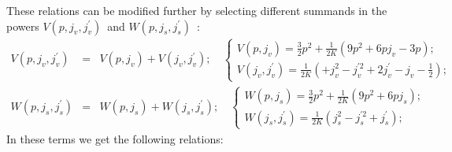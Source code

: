 \documentclass{article}
\begin{document}
These relations can be modified further by selecting different summands in
the powers $V\left( p,j_{v},j_{v}^{\prime }\right) $\ and $W\left(
p,j_{s},j_{s}^{\prime }\right) $\ :
\begin{eqnarray*}
V\left( p,j_{v},j_{v}^{\prime }\right)  &=&V\left( p,j_{v}\right) +V\left(
j_{v},j_{v}^{\prime }\right) ;\quad \left\{
\begin{array}{c}
V\left( p,j_{v}\right) =\frac{3}{2}p^{2}+\frac{1}{2K}\left(
9p^{2}+6pj_{v}-3p\right) ; \\
V\left( j_{v},j_{v}^{\prime }\right) =\frac{1}{2K}\left(
+j_{v}^{2}-j_{v}^{\prime 2}+2j_{v}^{\prime }-j_{v}-\frac{1}{2}\right) ;
\end{array}
\right.  \\
W\left( p,j_{s},j_{s}^{\prime }\right)  &=&W\left( p,j_{s}\right) +W\left(
j_{s},j_{s}^{\prime }\right) ;\quad \left\{
\begin{array}{c}
W\left( p,j_{s}\right) =\frac{3}{2}p^{2}+\frac{1}{2K}\left(
9p^{2}+6pj_{s}\right) ; \\
W\left( j_{s},j_{s}^{\prime }\right) =\frac{1}{2K}\left(
j_{s}^{2}-j_{s}^{\prime 2}+j_{s}^{\prime }\right) ;
\end{array}
\right.
\end{eqnarray*}
In these terms we get the following relations:
\end{document}
